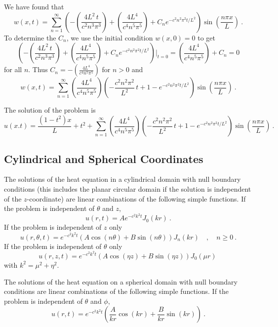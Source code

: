 \begin{egg}
We have found that
\[
w(x,t) = \sum_{n=1}^\infty \left(
-\left(\frac{4L^2\,t}{c^2n^3\pi^3}\right)
+ \left(\frac{4L^4}{c^4n^5\pi^5}\right) + C_n e^{-c^2n^2\pi^2 t/L^2}
\right) \sin\left(\frac{n\pi x}{L}\right) \  .
\]
To determine the $C_n$, we use the initial condition $w(x,0)=0$ to
get
\[
\left(-\left(\frac{4L^2\,t}{c^2n^3\pi^3}\right)
+ \left(\frac{4L^4}{c^4n^5\pi^5}\right) + C_n e^{-c^2n^2\pi^2 t/L^2}
\right)\bigg|_{t=0} = \left(\frac{4L^4}{c^4n^5\pi^5}\right) +
C_n = 0
\]
for all $n$.  Thus
$\displaystyle C_n = -\left(\frac{4L^4}{c^4n^5\pi^5}\right)$ for $n>0$
and
\[
w(x,t) = \sum_{n=1}^\infty \left(\frac{4L^4}{c^4n^5\pi^5}\right)
\left( -\frac{c^2n^2\pi^2}{L^2}\, t + 1 - e^{-c^2n^2\pi^2 t/L^2}\right)
\sin\left(\frac{n\pi x}{L}\right) \  .
\]

The solution of the problem is
\[
u(x.t) = \frac{(1-t^2)x}{L} + t^2 +
\sum_{n=1}^\infty \left(\frac{4L^4}{c^4n^5\pi^5}\right)
\left( -\frac{c^2n^2\pi^2}{L^2}\, t + 1 - e^{-c^2n^2\pi^2 t/L^2}\right)
\sin\left(\frac{n\pi x}{L}\right) \  .
\]
\end{egg}

\subsection{Cylindrical and Spherical Coordinates}

\begin{rmk}
The solutions of the heat equation in a cylindrical domain with null
boundary conditions (this includes the planar circular domain if the
solution is independent of the $z$-coordinate) are linear combinations
of the following simple functions.  If the problem is independent of
$\theta$ and $z$,
\[
u(r,t) = A e^{-c^2 k^2 t} J_0(k r) \ .
\]
If the problem is independent of $z$ only
\[
u(r,\theta,t) = e^{-c^2 k^2 t}
\left(A \cos(n \theta) + B \sin (n \theta)\right) J_n(k r) \quad ,
\quad n \geq 0 \ .
\]
If the problem is independent of $\theta$ only
\[
u(r,z,t) = e^{-c^2 k^2 t}
\left(A \cos (\eta z) + B \sin (\eta z)\right)J_0(\mu r)\
\]
with $k^2 = \mu^2 + \eta^2$.
\end{rmk}

\begin{rmk}
The solutions of the heat equation on a spherical domain with null
boundary conditions are linear combinations of the following simple
functions.  If the problem is independent of $\theta$ and $\phi$,
\[
u(r,t) = e^{-c^2 k^2 t} \left(\frac{A}{k r}
\cos(k r) + \frac{B}{k r} \sin (k r)\right) \ .
\]
\end{rmk}

